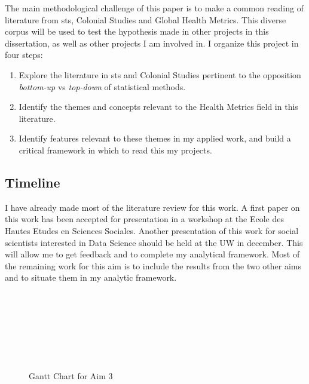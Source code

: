 The main methodological challenge of this paper is to make a common reading of literature from \gls{sts}, Colonial Studies and Global Health Metrics. This diverse corpus will be used to test the hypothesis made in other projects in this dissertation, as well as other projects I am involved in. I organize this project in four steps:

\begin{enumerate}
\item Explore the literature in \gls{sts} and Colonial Studies pertinent to the opposition \textit{bottom-up} vs \textit{top-down} of statistical methods.
\item Identify the themes and concepts relevant to the Health Metrics field in this literature.
\item Identify features relevant to these themes in my applied work, and build a critical framework in which to read this my projects.
\end{enumerate}

\subsection{Timeline}
\label{timeline:aim3}

I have already made most of the literature review for this work. A first paper on this work has been accepted for presentation in a workshop at the Ecole des Hautes Etudes en Sciences Sociales. Another presentation of this work for social scientists interested in Data Science should be held at the UW in december. This will allow me to get feedback and to complete my analytical framework. Most of the remaining work for this aim is to include the results from the two other aims and to situate them in my analytic framework.


\begin{figure}[!t]
	\begin{ganttchart}[vgrid,hgrid,y unit chart=.6cm]{1}{9}
		 \\
		 \\

		 \\
		 \\
		 \\
		 \\
	\end{ganttchart}
	\caption{Gantt Chart for Aim 3}
	\label{GanttPaper3}
\end{figure}
